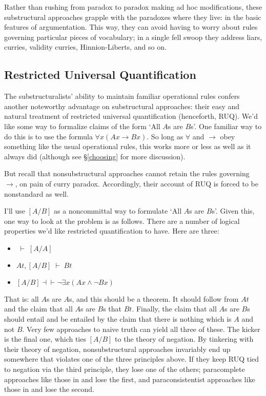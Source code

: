 \documentclass{ergoclass}
\newcommand{\SQQ}[2]{\ensuremath{#1 \;\vdash\; #2}}
\newcommand{\rall}[3]{\ensuremath{#1[#2/#3]}}
\newcommand{\amexists}{\ensuremath{\exists}}
\newcommand{\amforall}{\ensuremath{\forall}}
\newcommand{\amcond}{\ensuremath{\rightarrow}}
\newcommand{\amand}{\ensuremath{\wedge}}
\renewcommand{\cite}{\citet}						%
\begin{document}
Rather than rushing from paradox to paradox making ad hoc modifications, these substructural approaches grapple with the paradoxes where they live: in the basic features of argumentation. This way, they can avoid having to worry about rules governing particular pieces of vocabulary; in a single fell swoop they address liars, curries, validity curries, Hinnion-Liberts, and so on.

\subsection{Restricted Universal Quantification} \label{ruq}

The substructuralists' ability to maintain familiar operational rules confers another noteworthy advantage on substructural approaches: their easy and natural treatment of restricted universal quantification (henceforth, RUQ). We'd like some way to formalize claims of the form `All $A$s are $B$s'. One familiar way to do this is to use the formula $\amforall x (Ax \amcond Bx)$. So long as $\amforall$ and $\amcond$ obey something like the usual operational rules, this works more or less as well as it always did (although see \S\ref{choosing} for more discussion). 

But recall that nonsubstructural approaches cannot retain the rules governing $\amcond$, on pain of curry paradox. Accordingly, their account of RUQ is forced to be nonstandard as well.

I'll use $\rall{}{A}{B}$ as a noncommittal way to formulate `All $A$s are $B$s'. Given this, one way to look at the problem is as follows. There are a number of logical properties we'd like restricted quantification to have. Here are three:
\begin{itemize}
\item $\SQQ{}{\rall{}{A}{A}}$
\item $\SQQ{At, \rall{}{A}{B}}{Bt}$
\item $\rall{}{A}{B} \dashv \vdash \neg \amexists x (Ax \amand \neg Bx)$
\end{itemize}
That is: all $A$s are $A$s, and this should be a theorem. 
It should follow from $At$ and the claim that all $A$s are $B$s that $Bt$. Finally, the claim that all $A$s are $B$s should entail and be entailed by the claim that there is nothing which is $A$ and not $B$. Very few approaches to naive truth can yield all three of these. The kicker is the final one, which ties $\rall{}{A}{B}$ to the theory of negation. By tinkering with their theory of negation, nonsubstructural approaches invariably end up somewhere that violates one of the three principles above. If they keep RUQ tied to negation via the third principle, they lose one of the others; paracomplete approaches like those in \cite{brady:ul} and \cite{field:stp} lose the first, and paraconsistentist approaches like those in \cite{priest:ic} and \cite{beall:sot} lose the second.
\end{document}
